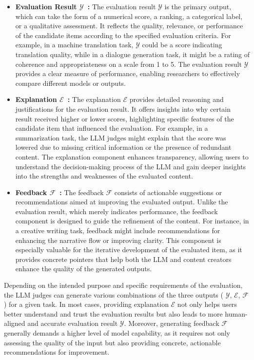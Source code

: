 \begin{itemize}[leftmargin=*]
    \item \textbf{Evaluation Result $\mathcal{Y}$~\cite{zhao2024auto,saad2023ares}: } The evaluation result $\mathcal{Y}$ is the primary output, which can take the form of a numerical score, a ranking, a categorical label, or a qualitative assessment. It reflects the quality, relevance, or performance of the candidate items according to the specified evaluation criteria. For example, in a machine translation task, $\mathcal{Y}$ could be a score indicating translation quality, while in a dialogue generation task, it might be a rating of coherence and appropriateness on a scale from 1 to 5. The evaluation result $\mathcal{Y}$ provides a clear measure of performance, enabling researchers to effectively compare different models or outputs.
    
    \item \textbf{Explanation $\mathcal{E}$~\cite{ye2024beyond,xie2024improving}: } The explanation $\mathcal{E}$ provides detailed reasoning and justifications for the evaluation result. It offers insights into why certain result received higher or lower scores, highlighting specific features of the candidate item that influenced the evaluation. For example, in a summarization task, the LLM judges might explain that the score was lowered due to missing critical information or the presence of redundant content. The explanation component enhances transparency, allowing users to understand the decision-making process of the LLM and gain deeper insights into the strengths and weaknesses of the evaluated content.

    
    \item \textbf{Feedback $\mathcal{F}$~\cite{madaan2024self,chen2023teaching}: } The feedback $\mathcal{F}$ consists of actionable suggestions or recommendations aimed at improving the evaluated output. Unlike the evaluation result, which merely indicates performance, the feedback component is designed to guide the refinement of the content. For instance, in a creative writing task, feedback might include recommendations for enhancing the narrative flow or improving clarity. This component is especially valuable for the iterative development of the evaluated item, as it provides concrete pointers that help both the LLM and content creators enhance the quality of the generated outputs.
\end{itemize}


Depending on the intended purpose and specific requirements of the evaluation, the LLM judges can generate various combinations of the three outputs ( $\mathcal{Y}$, $\mathcal{E}$, $\mathcal{F}$ ) for a given task. 
In most cases, providing explanation $\mathcal{E}$ not only helps users better understand and trust the evaluation results but also leads to more human-aligned and accurate evaluation result $\mathcal{Y}$. Moreover, generating feedback $\mathcal{F}$ generally demands a higher level of model capability, as it requires not only assessing the quality of the input but also providing concrete, actionable recommendations for improvement.

